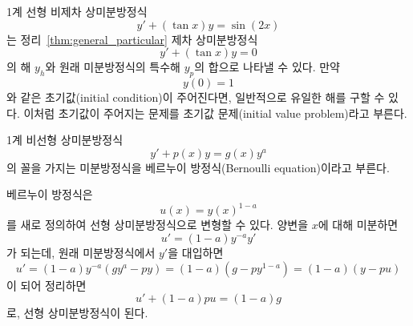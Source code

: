 \documentclass[../engineering_mathematics_lecture_note.tex]{subfiles}
\begin{document}
\begin{example}
    1계 선형 비제차 상미분방정식
    \begin{equation*}
        y' + (\tan x) y = \sin(2x)
    \end{equation*}
    는 정리~\ref{thm:general_particular} 제차 상미분방정식
    \begin{equation*}
        y' + (\tan x) y = 0
    \end{equation*}
    의 해 $y_h$와 원래 미분방정식의 특수해 $y_p$의 합으로 나타낼 수 있다.
    만약
    \begin{equation*}
        y(0) = 1
    \end{equation*}
    와 같은 초기값(initial condition)이 주어진다면, 일반적으로 유일한 해를 구할 수 있다.
    이처럼 초기값이 주어지는 문제를 초기값 문제(initial value problem)라고 부른다.
\end{example}

\begin{example}
    1계 비선형 상미분방정식
    \begin{equation*}
        y' + p(x) y = g(x) y^a
    \end{equation*}
    의 꼴을 가지는 미분방정식을 베르누이 방정식(Bernoulli equation)이라고 부른다.
\end{example}

베르누이 방정식은
\begin{equation*}
    u(x) = y(x)^{1 - a}
\end{equation*}
를 새로 정의하여 선형 상미분방정식으로 변형할 수 있다.
양변을 $x$에 대해 미분하면
\begin{equation*}
    u' = (1 - a) y^{-a} y'
\end{equation*}
가 되는데, 원래 미분방정식에서 $y'$을 대입하면
\begin{equation*}
    u' = (1 - a) y^{-a} (gy^a - py) = (1 - a) \left(g - py^{1 - a}\right) = (1 - a) (y - pu)
\end{equation*}
이 되어 정리하면
\begin{equation*}
    u' + (1 - a)pu = (1 - a)g
\end{equation*}
로, 선형 상미분방정식이 된다.
\end{document}
